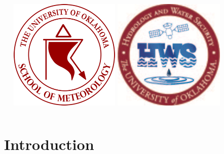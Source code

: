 \documentclass{beamer}
\begin{document}
\begin{frame}[t]{}
\begin{columns}
				
				~~ %
				\includegraphics[width = 0.398\textwidth]{../Figures/Poster/SoMLogo.png}
				\hspace*{-0.3cm}
				\includegraphics[width = 0.40\textwidth]{../Figures/Poster/HWS-Logo.png}
		\end{columns}
		\vspace*{0.0cm} %
		
		\begin{columns}[t]
			
			
			\section{Introduction} %
			

\end{columns}
\end{frame}
\end{document}
